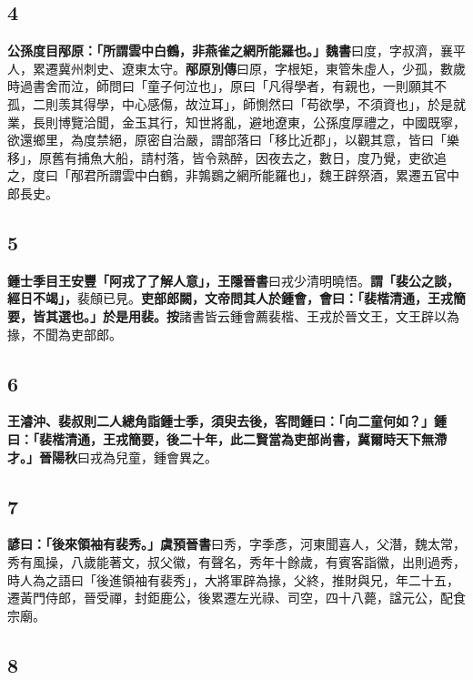 \subsection*{4}

\textbf{公孫度目邴原：「所謂雲中白鶴，非燕雀之網所能羅也。」}{\footnotesize \textbf{魏書}曰度，字叔濟，襄平人，累遷冀州刺史、遼東太守。\textbf{邴原別傳}曰原，字根矩，東管朱虛人，少孤，數歲時過書舍而泣，師問曰「童子何泣也」，原曰「凡得學者，有親也，一則願其不孤，二則羡其得學，中心感傷，故泣耳」，師惻然曰「苟欲學，不須資也」，於是就業，長則博覽洽聞，金玉其行，知世將亂，避地遼東，公孫度厚禮之，中國既寧，欲還鄉里，為度禁絕，原密自治嚴，謂部落曰「移比近郡」，以觀其意，皆曰「樂移」，原舊有捕魚大船，請村落，皆令熟醉，因夜去之，數日，度乃覺，吏欲追之，度曰「邴君所謂雲中白鶴，非鶉鷃之網所能羅也」，魏王辟祭酒，累遷五官中郎長史。}

\subsection*{5}

\textbf{鍾士季目王安豐「阿戎了了解人意」，}{\footnotesize \textbf{王隱晉書}曰戎少清明曉悟。}\textbf{謂「裴公之談，經日不竭」，}{\footnotesize 裴頠已見。}\textbf{吏部郎闕，文帝問其人於鍾會，會曰：「裴楷清通，王戎簡要，皆其選也。」於是用裴。}{\footnotesize \textbf{按}諸書皆云鍾會薦裴楷、王戎於晉文王，文王辟以為掾，不聞為吏部郎。}

\subsection*{6}

\textbf{王濬沖、裴叔則二人總角詣鍾士季，須臾去後，客問鍾曰：「向二童何如？」鍾曰：「裴楷清通，王戎簡要，後二十年，此二賢當為吏部尚書，冀爾時天下無滯才。」}{\footnotesize \textbf{晉陽秋}曰戎為兒童，鍾會異之。}

\subsection*{7}

\textbf{諺曰：「後來領袖有裴秀。」}{\footnotesize \textbf{虞預晉書}曰秀，字季彥，河東聞喜人，父潛，魏太常，秀有風操，八歲能著文，叔父徽，有聲名，秀年十餘歲，有賓客詣徽，出則過秀，時人為之語曰「後進領袖有裴秀」，大將軍辟為掾，父終，推財與兄，年二十五，遷黃門侍郎，晉受禪，封鉅鹿公，後累遷左光祿、司空，四十八薨，諡元公，配食宗廟。}

\subsection*{8}

